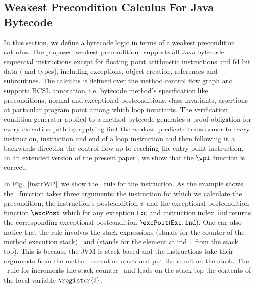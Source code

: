 \subsection{Weakest Precondition Calculus For Java Bytecode}\label{wpbc}
In this section, we define a bytecode logic in terms of a weakest precondition calculus. The proposed weakest precondition \wpi \ supports all Java bytecode sequential instructions except for floating point arithmetic instructions and 64 bit data ( and  types), including exceptions, object creation,
 references and subroutines. The calculus is defined over the method control flow graph and supports BCSL annotation,
 i.e. bytecode method's specification like preconditions, normal and exceptional postconditions, class invariants,
 assertions at particular program point among which loop invariants. The verification condition generator applied to a method 
bytecode generates a proof obligation for every execution path
 by applying first the weakest predicate transformer to every  instruction,
  instruction and end of a loop instruction and then following in a backwards direction the control
 flow up to reaching the entry point instruction.
 In an extended version of the present paper \cite{JBL05MP}, we show that the $\wpi$ function is correct.

 In Fig.~\ref{instrWP}, we show the \wpi \ rule for the  instruction.
 As the example shows the \wpi \ function takes three arguments:
the instruction for which we calculate the precondition, 
the instruction's postcondition $\psi$ and the exceptional postcondition function $\excPost$ which for any exception \texttt{Exc} and 
instruction index \texttt{ind} returns the
corresponding exceptional postcondition $\excPost(\texttt{Exc}, \tt{ind})$. One can also notice that the rule involves the stack expressions \counter 
(stands for the counter of the method execution stack) \ and  (stands for the element at ind \texttt{i} from the stack top).
 This is because the JVM is stack based and the instructions take their arguments from the method execution stack and 
 put the result on the stack.
 The \wpi \ rule for   increments the stack counter \counter \ and loads on the stack top the contents
 of the local variable $\register{i}$. 




